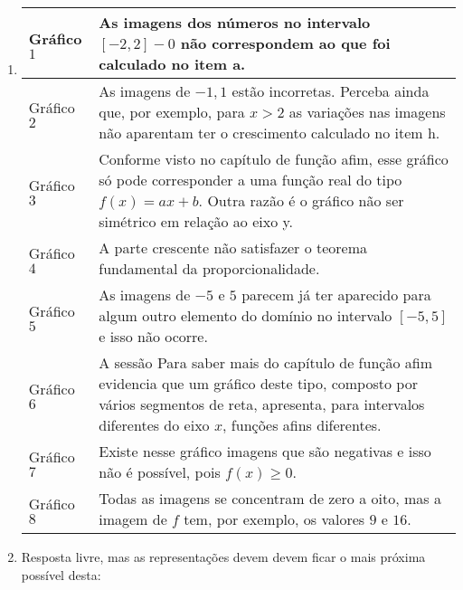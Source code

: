 \documentclass[10 pt,usenames,dvipsnames, oneside]{article}
\begin{document}
\begin{solucao}
\begin{enumerate}
\item {}
{
\begin{tabular}{|e{.1\linewidth}|e{.8\linewidth}|}
\hline
Gráfico \(1\) & As imagens dos números no intervalo \([-2,2]-{0}\) não correspondem ao que foi calculado no item a. \tabularnewline
\hline
Gráfico \(2\) & As imagens de \({-1, 1}\) estão incorretas. Perceba ainda que, por exemplo, para \(x>2\) as variações nas imagens não aparentam ter o crescimento calculado no item h. \tabularnewline
\hline
Gráfico \(3\) & Conforme visto no capítulo de função afim, esse gráfico só pode corresponder a uma função real do tipo \(f(x)=ax+b\). Outra razão é o gráfico não ser simétrico em relação ao eixo y. \tabularnewline
\hline
Gráfico \(4\) & A parte crescente não satisfazer o teorema fundamental da proporcionalidade. \tabularnewline
\hline
Gráfico \(5\) & As imagens de \(-5\) e \(5\) parecem já ter aparecido para algum outro elemento do domínio no intervalo \([-5,5]\) e isso não ocorre. \tabularnewline
\hline
Gráfico \(6\) & A sessão Para saber mais do capítulo de função afim evidencia que um gráfico deste tipo, composto por vários segmentos de reta, apresenta, para intervalos diferentes do eixo \(x\), funções afins diferentes. \tabularnewline
\hline
Gráfico \(7\) & Existe nesse gráfico imagens que são negativas e isso não é possível, pois \(f(x) \geq 0\). \tabularnewline
\hline
Gráfico \(8\) & Todas as imagens se concentram de zero a oito, mas a imagem de \(f\) tem, por exemplo, os valores \(9\) e \(16\). \tabularnewline
\hline
\end{tabular}
}
\clearpage

\item Resposta livre, mas as representações devem devem ficar o mais próxima possível desta:

\begin{figure}[H]
\centering


\end{figure}
\end{enumerate}
\end{solucao}
\end{document}
